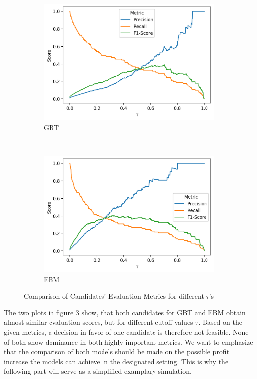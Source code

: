 \documentclass[12pt,titlepage]{article}
\begin{document}
\begin{figure}[H]
    \centering
    \begin{subfigure}{.70\textwidth}
      \includegraphics[width=1\linewidth]{gbt_prec_rec_plot.png}
      \caption{GBT}
      \label{fig:gbt_prec_rec_plot}
    \end{subfigure} \\
    \begin{subfigure}{.70\textwidth}
      \includegraphics[width=1\linewidth]{ebm_prec_rec_plot.png}
      \caption{EBM}
      \label{fig:ebm_prec_rec_plot}
    \end{subfigure}
    \caption{Comparison of Candidates' Evaluation Metrics for different $\tau$'s}
\label{fig:prec_rec_plot}
\end{figure}
\noindent
The two plots in figure \ref{fig:prec_rec_plot} show, that both candidates for GBT and EBM obtain almost similar evaluation scores, but for different cutoff values $\tau$. Based on the given metrics, a decision in favor of one candidate is therefore not feasible. None of both show dominance in both highly important metrics. We want to emphasize that the comparison of both models should be made on the possible profit increase the models can achieve in the designated setting. This is why the following part will serve as a simplified examplary simulation. \\
\end{document}

